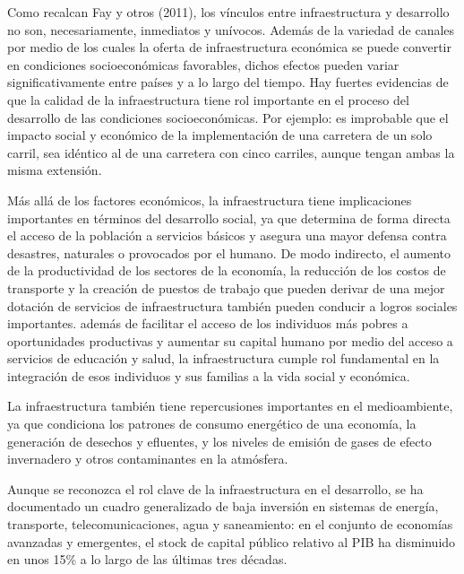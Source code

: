 \documentclass{article}
\begin{document}
Como recalcan Fay y otros (2011), los vínculos entre infraestructura y
desarrollo no son, necesariamente, inmediatos y unívocos. Además de la
variedad de canales por medio de los cuales la oferta de infraestructura
económica se puede convertir en condiciones socioeconómicas favorables,
dichos efectos pueden variar significativamente entre países y a lo
largo del tiempo. Hay fuertes evidencias de que la calidad de la
infraestructura tiene rol importante en el proceso del desarrollo de las
condiciones socioeconómicas. Por ejemplo: es improbable que el impacto
social y económico de la implementación de una carretera de un solo
carril, sea idéntico al de una carretera con cinco carriles, aunque
tengan ambas la misma extensión.

Más allá de los factores económicos, la infraestructura tiene
implicaciones importantes en términos del desarrollo social, ya que
determina de forma directa el acceso de la población a servicios básicos
y asegura una mayor defensa contra desastres, naturales o provocados por
el humano. De modo indirecto, el aumento de la productividad de los
sectores de la economía, la reducción de los costos de transporte y la
creación de puestos de trabajo que pueden derivar de una mejor dotación
de servicios de infraestructura también pueden conducir a logros
sociales importantes. además de facilitar el acceso de los individuos
más pobres a oportunidades productivas y aumentar su capital humano por
medio del acceso a servicios de educación y salud, la infraestructura
cumple rol fundamental en la integración de esos individuos y sus
familias a la vida social y económica.

La infraestructura también tiene repercusiones importantes en el
medioambiente, ya que condiciona los patrones de consumo energético de
una economía, la generación de desechos y efluentes, y los niveles de
emisión de gases de efecto invernadero y otros contaminantes en la
atmósfera.

Aunque se reconozca el rol clave de la infraestructura en el desarrollo,
se ha documentado un cuadro generalizado de baja inversión en sistemas
de energía, transporte, telecomunicaciones, agua y saneamiento: en el
conjunto de economías avanzadas y emergentes, el stock de capital
público relativo al PIB ha disminuido en unos 15\% a lo largo de las
últimas tres décadas.
\end{document}
